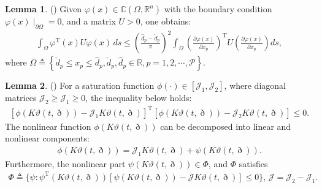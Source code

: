\documentclass[preprint,review,fleqn,sort&compress,3p]{elsarticle}
\theoremstyle{definition}%
\newtheorem{Lem}{Lemma}[section]
\begin{document}
	\begin{Lem}\label{lem3}
		(\cite{wu2023adaptiveb}) Given $ \varphi(x) \in \mathbb{C}(\Omega,\mathbb{R}^n)$ with the boundary condition $ \varphi(x)\mid_{\partial \Omega} = 0 $, and a matrix $ U >0 $, one obtains:
		\begin{align*}
			\int_\Omega \varphi^\text{T}(x) U \varphi(x) \, ds \leq \left( \frac{\hat{d}_p - \check{d}_p}{\pi} \right)^2 \int_\Omega \left( \frac{\partial \varphi(x)}{\partial x_p} \right)^\text{T} U \left( \frac{\partial \varphi(x)}{\partial x_p} \right) ds,
		\end{align*}
		where $\Omega \triangleq \left\{\check{d}_p \leq x_p \leq \hat{d}_p, \check{d}_p, \hat{d}_p \in \mathbb{R},p=1,2,\cdots,\mathcal{P} \right\}$.
	\end{Lem}
	\begin{Lem}\label{lem4}
		(\cite{li2020dynamic}) For a saturation function $ \phi(\cdot) \in \left[\mathcal{J}_1, \mathcal{J}_2 \right] $, where diagonal matrices $ \mathcal{J}_2 \geq \mathcal{J}_1 \geq 0 $, the inequality below holds:
		\begin{align*}
			\left[\phi(K\vartheta(t, \eth)) - \mathcal{J}_1 K \vartheta(t, \eth)\right]^\text{T} \left[\phi(K\vartheta(t, \eth)) - \mathcal{J}_2 K \vartheta(t, \eth)\right] \leq 0.
		\end{align*}
		The nonlinear function $ \phi(K\vartheta(t, \eth)) $ can be decomposed into linear and nonlinear components:
		\begin{align*}
			\phi(K\vartheta(t, \eth)) = \mathcal{J}_1 K \vartheta(t, \eth) + \psi(K\vartheta(t, \eth)).
		\end{align*}
		Furthermore, the nonlinear part $ \psi(K\vartheta(t, \eth)) \in \Phi $, and $ \Phi $ satisfies
		\begin{align*}
			\Phi \triangleq \{ \psi: \psi^\text{T} (K\vartheta(t, \eth)) \left[\psi(K\vartheta(t, \eth)) - \mathcal{J} K \vartheta(t, \eth)\right] \leq 0 \},\, \mathcal{J} = \mathcal{J}_2 - \mathcal{J}_1.
		\end{align*}
	\end{Lem}
\end{document}
